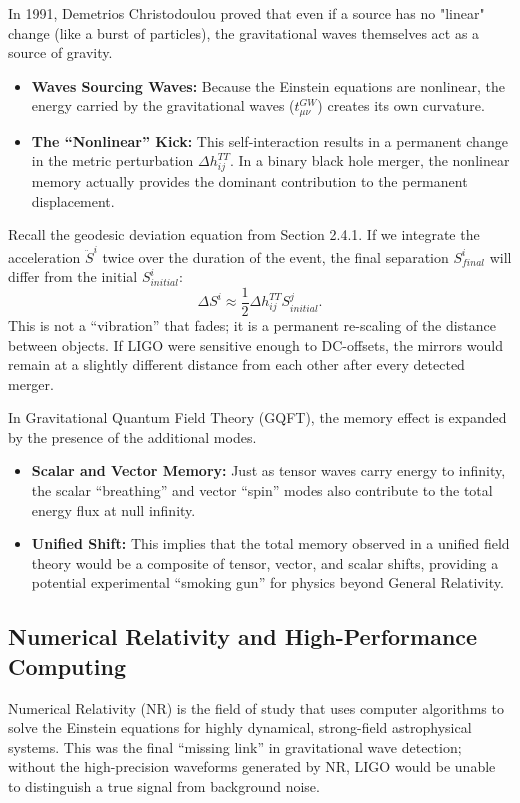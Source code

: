In 1991, Demetrios Christodoulou proved that even if a source has no "linear" change (like a burst of particles), the gravitational waves themselves act as a source of gravity.
\begin{itemize}
  \item \textbf{Waves Sourcing Waves:} Because the Einstein equations are nonlinear, the energy carried by the gravitational waves ($t_{\mu\nu}^{GW}$) creates its own curvature.
  \item \textbf{The ``Nonlinear'' Kick:} This self-interaction results in a permanent change in the metric perturbation $\Delta h_{ij}^{TT}$. In a binary black hole merger, the nonlinear memory actually provides the dominant contribution to the permanent displacement.
\end{itemize}

Recall the geodesic deviation equation from Section 2.4.1. If we integrate the acceleration $\ddot{S}^i$ twice over the duration of the event, the final separation $S^i_{final}$ will differ from the initial $S^i_{initial}$:
\[%
  \Delta S^i \approx \frac{1}{2} \Delta h_{ij}^{TT} S^j_{initial}
.\]%
This is not a ``vibration'' that fades; it is a permanent re-scaling of the distance between objects. If LIGO were sensitive enough to DC-offsets, the mirrors would remain at a slightly different distance from each other after every detected merger.

In Gravitational Quantum Field Theory (GQFT), the memory effect is expanded by the presence of the additional modes.
\begin{itemize}
  \item \textbf{Scalar and Vector Memory:} Just as tensor waves carry energy to infinity, the scalar ``breathing'' and vector ``spin'' modes also contribute to the total energy flux at null infinity.
  \item \textbf{Unified Shift:} This implies that the total memory observed in a unified field theory would be a composite of tensor, vector, and scalar shifts, providing a potential experimental ``smoking gun'' for physics beyond General Relativity.
\end{itemize}

\subsection{Numerical Relativity and High-Performance Computing} Numerical Relativity (NR) is the field of study that uses computer algorithms to solve the Einstein equations for highly dynamical, strong-field astrophysical systems. This was the final ``missing link'' in gravitational wave detection; without the high-precision waveforms generated by NR, LIGO would be unable to distinguish a true signal from background noise.

